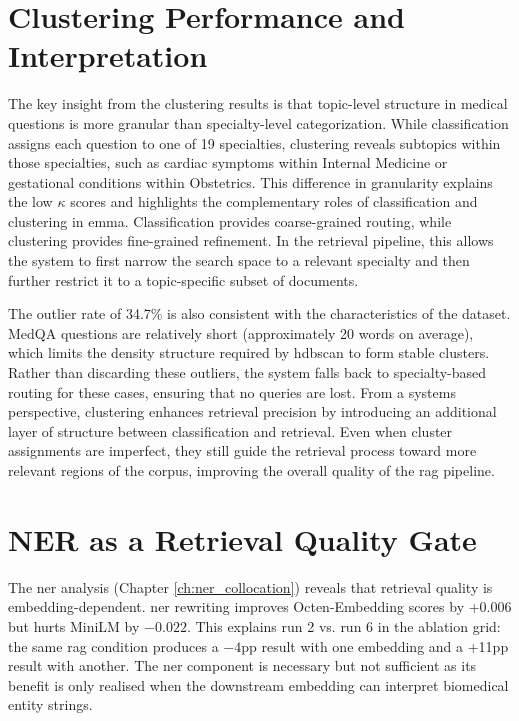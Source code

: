\section{Clustering Performance and Interpretation}
The key insight from the clustering results is that topic-level structure in medical questions is more granular than specialty-level categorization. While classification assigns each question to one of 19 specialties, clustering reveals subtopics within those specialties, such as cardiac symptoms within Internal Medicine or gestational conditions within Obstetrics. This difference in granularity explains the low $\kappa$ scores and highlights the complementary roles of classification and clustering in \gls{emma}. Classification provides coarse-grained routing, while clustering provides fine-grained refinement. In the retrieval pipeline, this allows the system to first narrow the search space to a relevant specialty and then further restrict it to a topic-specific subset of documents. 

The outlier rate of 34.7\% is also consistent with the characteristics of the dataset. MedQA questions are relatively short (approximately 20 words on average), which limits the density structure required by \gls{hdbscan} to form stable clusters. Rather than discarding these outliers, the system falls back to specialty-based routing for these cases, ensuring that no queries are lost. From a systems perspective, clustering enhances retrieval precision by introducing an additional layer of structure between classification and retrieval. Even when cluster assignments are imperfect, they still guide the retrieval process toward more relevant regions of the corpus, improving the overall quality of the \gls{rag} pipeline. 

\section{NER as a Retrieval Quality Gate}
The \gls{ner} analysis (Chapter \ref{ch:ner_collocation}) reveals that retrieval quality is embedding-dependent. \gls{ner} rewriting improves Octen-Embedding scores by +0.006 but hurts MiniLM by $-0.022$. This explains run 2 vs. run 6 in the ablation grid: the same \gls{rag} condition produces a $-4$\gls{pp} result with one embedding and a +11\gls{pp} result with another. The \gls{ner} component is necessary but not sufficient as its benefit is only realised when the downstream embedding can interpret biomedical entity strings. 

